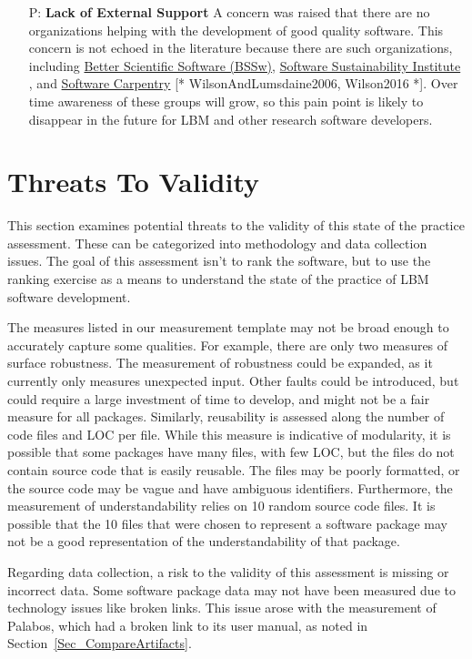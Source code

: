 \documentclass[runningheads]{llncs}
\newcounter{pnum} %
\begin{document}
\begin{enumerate}
	\item[P\refstepcounter{pnum}\thepnum \label{P_LackExtSupport}:] \textbf{Lack
	of External Support} A concern was raised that there are no organizations
	helping with the development of good quality software.  This concern is not
	echoed in the literature because there are such organizations, including
	\href{https://bssw.io/} {Better Scientific Software (BSSw)},
	\href{https://www.software.ac.uk/} {Software Sustainability Institute}
	\cite{CrouchEtAl2013}, and \href{https://software-carpentry.org/}{Software
	Carpentry} [* {WilsonAndLumsdaine2006, Wilson2016} *]. Over time awareness of
	these groups will grow, so this pain point is likely to disappear in the
	future for LBM and other research software developers.

\end{enumerate}

\section{Threats To Validity} \label{threats}

This section examines potential threats to the validity of this state of the
practice assessment. These can be categorized into methodology and data
collection issues. The goal of this assessment isn't to rank the software, but
to use the ranking exercise as a means to understand the state of the practice
of LBM software development.

The measures listed in our measurement template may not be broad enough to
accurately capture some qualities. For example, there are only two measures of
surface robustness. The measurement of robustness could be expanded, as it
currently only measures unexpected input. Other faults could be introduced, but
could require a large investment of time to develop, and might not be a fair
measure for all packages. Similarly, reusability is assessed along the number of
code files and LOC per file. While this measure is indicative of modularity, it
is possible that some packages have many files, with few LOC, but the files do
not contain source code that is easily reusable. The files may be poorly
formatted, or the source code may be vague and have ambiguous identifiers.
Furthermore, the measurement of understandability relies on 10 random source
code files. It is possible that the 10 files that were chosen to represent a
software package may not be a good representation of the understandability of
that package.

Regarding data collection, a risk to the validity of this assessment is missing
or incorrect data. Some software package data may not have been measured due to
technology issues like broken links. This issue arose with the measurement of
Palabos, which had a broken link to its user manual, as noted in
Section~\ref{Sec_CompareArtifacts}. 
\end{document}
